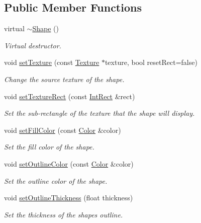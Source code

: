 \subsection*{Public Member Functions}
\begin{DoxyCompactItemize}
\item 
\mbox{\label{classsf_1_1_shape_a2262aceb9df52d4275c19633592f19bf}} 
virtual \hyperlink{classsf_1_1_shape_a2262aceb9df52d4275c19633592f19bf}{$\sim$\+Shape} ()
\begin{DoxyCompactList}\small\item\em Virtual destructor. \end{DoxyCompactList}\item 
void \hyperlink{classsf_1_1_shape_af8fb22bab1956325be5d62282711e3b6}{set\+Texture} (const \hyperlink{classsf_1_1_texture}{Texture} $\ast$texture, bool reset\+Rect=false)
\begin{DoxyCompactList}\small\item\em Change the source texture of the shape. \end{DoxyCompactList}\item 
void \hyperlink{classsf_1_1_shape_a2029cc820d1740d14ac794b82525e157}{set\+Texture\+Rect} (const \hyperlink{classsf_1_1_rect}{Int\+Rect} \&rect)
\begin{DoxyCompactList}\small\item\em Set the sub-\/rectangle of the texture that the shape will display. \end{DoxyCompactList}\item 
void \hyperlink{classsf_1_1_shape_a3506f9b5d916fec14d583d16f23c2485}{set\+Fill\+Color} (const \hyperlink{classsf_1_1_color}{Color} \&color)
\begin{DoxyCompactList}\small\item\em Set the fill color of the shape. \end{DoxyCompactList}\item 
void \hyperlink{classsf_1_1_shape_a5978f41ee349ac3c52942996dcb184f7}{set\+Outline\+Color} (const \hyperlink{classsf_1_1_color}{Color} \&color)
\begin{DoxyCompactList}\small\item\em Set the outline color of the shape. \end{DoxyCompactList}\item 
void \hyperlink{classsf_1_1_shape_a5ad336ad74fc1f567fce3b7e44cf87dc}{set\+Outline\+Thickness} (float thickness)
\begin{DoxyCompactList}\small\item\em Set the thickness of the shape\textquotesingle{}s outline. \end{DoxyCompactList}\item 

\end{DoxyCompactItemize}
